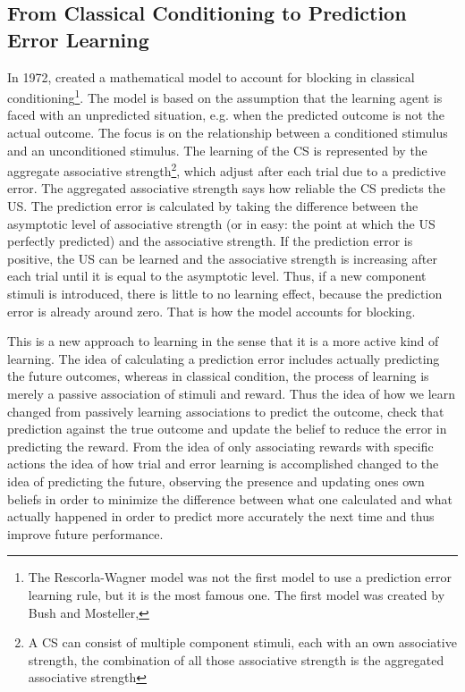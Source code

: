 \subsection{From Classical Conditioning to Prediction Error Learning}
In 1972, \citeauthor{rescorla1972theory} created a mathematical model to account for blocking in classical conditioning\footnote{The Rescorla-Wagner model was not the first model to use a prediction error learning rule, but it is the most famous one. The first model was created by Bush and Mosteller\cite{bush1951mathematical},\cite{bush1951model} }\citep{rescorla1972theory}. The model is based on the assumption that the learning agent is faced with an unpredicted situation, e.g. when the predicted outcome is not the actual outcome.
The focus is on the relationship between a conditioned stimulus and an unconditioned stimulus. 
The learning of the CS is represented by the aggregate associative strength\footnote{A CS can consist of multiple component stimuli, each with an own associative strength, the combination of all those associative strength is the aggregated associative strength}, which adjust after each trial due to a predictive error. The aggregated associative strength says how reliable the CS predicts the US.
The prediction error is calculated by taking the difference between the asymptotic level of associative strength (or in easy: the point at which the US perfectly predicted) and the associative strength. If the prediction error is positive, the US can be learned and the associative strength is increasing after each trial until it is equal to the asymptotic level. Thus, if a new component stimuli is introduced, there is little to no learning effect, because the prediction error is already around zero. That is how the model accounts for blocking.

This is a new approach to learning in the sense that it is a more active kind of learning. The idea of calculating a prediction error includes actually predicting the future outcomes, whereas in classical condition, the process of learning is merely a passive association of stimuli and reward. Thus the idea of how we learn changed from passively learning associations to predict the outcome, check that prediction against the true outcome and update the belief to reduce the error in predicting the reward. 
From the idea of only associating rewards with specific actions the idea of how trial and error learning is accomplished changed to the idea of predicting the future, observing the presence and updating ones own beliefs in order to minimize the difference between what one calculated and what actually happened in order to predict more accurately the next time and thus improve future performance. 

